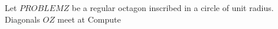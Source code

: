 Let $PROBLEMZ$ be a regular octagon inscribed in a circle of unit radius. Diagonals  $OZ$ meet at  Compute 